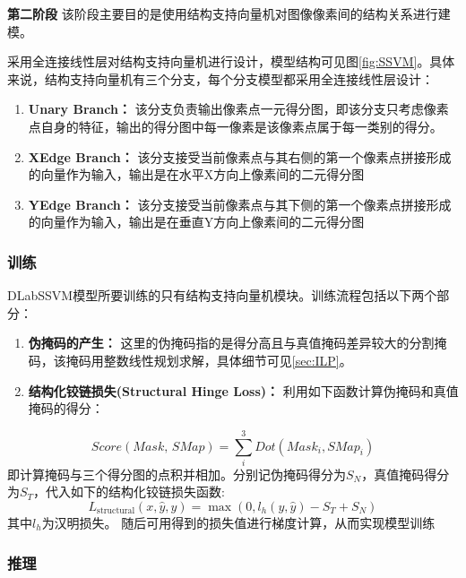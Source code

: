 \documentclass[a4paper,12pt]{ctexart}
\begin{document}
\textbf{第二阶段} 该阶段主要目的是使用结构支持向量机对图像像素间的结构关系进行建模。


采用全连接线性层对结构支持向量机进行设计，模型结构可见图\ref{fig:SSVM}。具体来说，结构支持向量机有三个分支，每个分支模型都采用全连接线性层设计：
\begin{enumerate}
    \item \textbf{Unary Branch：} 该分支负责输出像素点一元得分图，即该分支只考虑像素点自身的特征，输出的得分图中每一像素是该像素点属于每一类别的得分。
    \item \textbf{XEdge Branch：} 该分支接受当前像素点与其右侧的第一个像素点拼接形成的向量作为输入，输出是在水平X方向上像素间的二元得分图
    \item \textbf{YEdge Branch：} 该分支接受当前像素点与其下侧的第一个像素点拼接形成的向量作为输入，输出是在垂直Y方向上像素间的二元得分图
\end{enumerate}

\subsubsection{训练}

DLabSSVM模型所要训练的只有结构支持向量机模块。训练流程包括以下两个部分：
\begin{enumerate}
    \item \textbf{伪掩码的产生：} 这里的伪掩码指的是得分高且与真值掩码差异较大的分割掩码，该掩码用整数线性规划求解，具体细节可见\ref{sec:ILP}。
    \item \textbf{结构化铰链损失(Structural Hinge Loss)：} 利用如下函数计算伪掩码和真值掩码的得分：
\end{enumerate}
	$$
	Score(Mask,\,SMap) = \sum_{i}^3 Dot(Mask_{i},SMap_{i})
$$
	即计算掩码与三个得分图的点积并相加。分别记伪掩码得分为$S_{N}$，真值掩码得分为$S_{T}$，代入如下的结构化铰链损失函数:
	$$
L_{\text{structural}}(x, \hat{y}, y) = \max \left( 0, l_{h}(y, \hat{y}) - S_{T} + S_{N} \right)
$$
	其中$l_{h}$为汉明损失。
随后可用得到的损失值进行梯度计算，从而实现模型训练

\subsubsection{推理}
\end{document}
